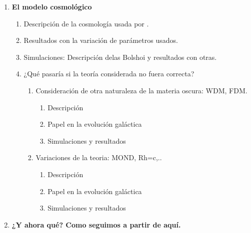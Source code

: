 \begin{enumerate}
	\item \textbf{El modelo cosmológico}
	\begin{enumerate}[{5.}1]
		\item Descripción de la cosmología usada por \cite{steinhardt2016impossibly}.
		\item Resultados con la variación de parámetros usados.
		\item Simulaciones: Descripción delas Bolshoi y resultados con otras.
		\item ¿Qué pasaría si la teoría considerada no fuera correcta?
		\begin{enumerate}[{5.4.}1]
			\item Consideración de otra naturaleza de la materia oscura: WDM, FDM.
			\begin{enumerate}[{5.4.1.}1]
				\item Descripción
				\item Papel en la evolución galáctica
				\item Simulaciones y resultados
			\end{enumerate}
			\item Variaciones de la teoria: MOND, Rh=c,..
			\begin{enumerate}[{5.5.}1]
				\item Descripción
				\item Papel en la evolución galáctica
				\item Simulaciones y resultados
			\end{enumerate}
		\end{enumerate}
	\end{enumerate}
	
	\item \textbf{¿Y ahora qué? Como seguimos a partir de aquí.}
\end{enumerate}

\newpage